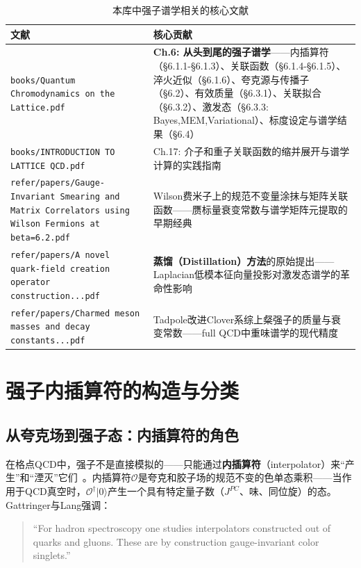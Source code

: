\documentclass[12pt,a4paper]{ctexart}
\theoremstyle{definition}
\begin{document}
\begin{table}[H]
\centering
\caption{本库中强子谱学相关的核心文献}
\label{tab:spec_papers}
\small
\begin{tabular}{lp{9cm}}
\toprule
文献 & 核心贡献 \\
\midrule
\texttt{books/Quantum Chromodynamics on the Lattice.pdf}~\cite{GattringerLang2010} & \textbf{Ch.6: 从头到尾的强子谱学}——内插算符（§6.1.1-§6.1.3）、关联函数（§6.1.4-§6.1.5）、淬火近似（§6.1.6）、夸克源与传播子（§6.2）、有效质量（§6.3.1）、关联拟合（§6.3.2）、激发态（§6.3.3: Bayes,MEM,Variational）、标度设定与谱学结果（§6.4）\\
\texttt{books/INTRODUCTION TO LATTICE QCD.pdf}~\cite{Gupta1997intro} & Ch.17: 介子和重子关联函数的缩并展开与谱学计算的实践指南 \\
\texttt{refer/papers/Gauge-Invariant Smearing and Matrix Correlators using Wilson Fermions at beta=6.2.pdf} & Wilson费米子上的规范不变量涂抹与矩阵关联函数——赝标量衰变常数与谱学矩阵元提取的早期经典 \\
\texttt{refer/papers/A novel quark-field creation operator construction...pdf} & \textbf{蒸馏（Distillation）方法}的原始提出——Laplacian低模本征向量投影对激发态谱学的革命性影响 \\
\texttt{refer/papers/Charmed meson masses and decay constants...pdf}~\cite{CharmedClover} & Tadpole改进Clover系综上粲强子的质量与衰变常数——full QCD中重味谱学的现代精度 \\
\bottomrule
\end{tabular}
\end{table}

\section{强子内插算符的构造与分类}

\subsection{从夸克场到强子态：内插算符的角色}

在格点QCD中，强子不是直接模拟的——只能通过\textbf{内插算符}（interpolator）来``产生''和``湮灭''它们~\cite{GattringerLang2010}。内插算符$\mathcal{O}$是夸克和胶子场的规范不变的色单态乘积——当作用于QCD真空时，$\mathcal{O}^\dagger|0\rangle$产生一个具有特定量子数（$J^{PC}$、味、同位旋）的态。Gattringer与Lang强调：
\begin{quote}
``For hadron spectroscopy one studies interpolators constructed out of quarks and gluons. These are by construction gauge-invariant color singlets.''~\cite{GattringerLang2010}
\end{quote}
\end{document}
